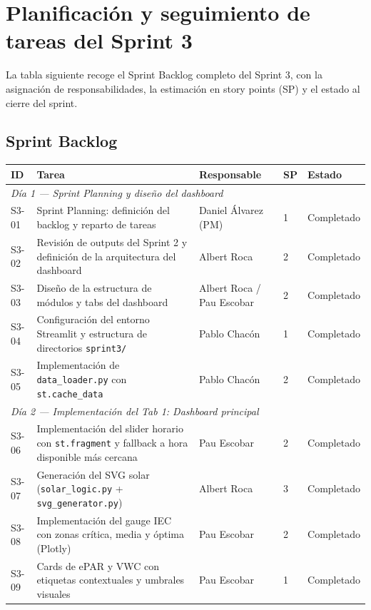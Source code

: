 \documentclass[11pt,a4paper]{article}
\begin{document}
\section{Planificación y seguimiento de tareas del Sprint 3}

La tabla siguiente recoge el Sprint Backlog completo del Sprint 3, con la asignación de
responsabilidades, la estimación en story points (SP) y el estado al cierre del sprint.

\subsection{Sprint Backlog}

\begin{longtable}{p{} p{} p{} p{} p{}}
\textbf{ID} & \textbf{Tarea} & \textbf{Responsable} & \textbf{SP} & \textbf{Estado} \\
\hline
\multicolumn{5}{l}{\textit{Día 1 — Sprint Planning y diseño del dashboard}} \\
S3-01 & Sprint Planning: definición del backlog y reparto de tareas & Daniel Álvarez (PM) & 1 & Completado \\
S3-02 & Revisión de outputs del Sprint 2 y definición de la arquitectura del dashboard & Albert Roca & 2 & Completado \\
S3-03 & Diseño de la estructura de módulos y tabs del dashboard & Albert Roca / Pau Escobar & 2 & Completado \\
S3-04 & Configuración del entorno Streamlit y estructura de directorios \texttt{sprint3/} & Pablo Chacón & 1 & Completado \\
S3-05 & Implementación de \texttt{data\_loader.py} con \texttt{st.cache\_data} & Pablo Chacón & 2 & Completado \\
\multicolumn{5}{l}{\textit{Día 2 — Implementación del Tab 1: Dashboard principal}} \\
S3-06 & Implementación del slider horario con \texttt{st.fragment} y fallback a hora disponible más cercana & Pau Escobar & 2 & Completado \\
S3-07 & Generación del SVG solar (\texttt{solar\_logic.py} + \texttt{svg\_generator.py}) & Albert Roca & 3 & Completado \\
S3-08 & Implementación del gauge IEC con zonas crítica, media y óptima (Plotly) & Pau Escobar & 2 & Completado \\
S3-09 & Cards de ePAR y VWC con etiquetas contextuales y umbrales visuales & Pau Escobar & 1 & Completado \\

\end{longtable}
\end{document}
